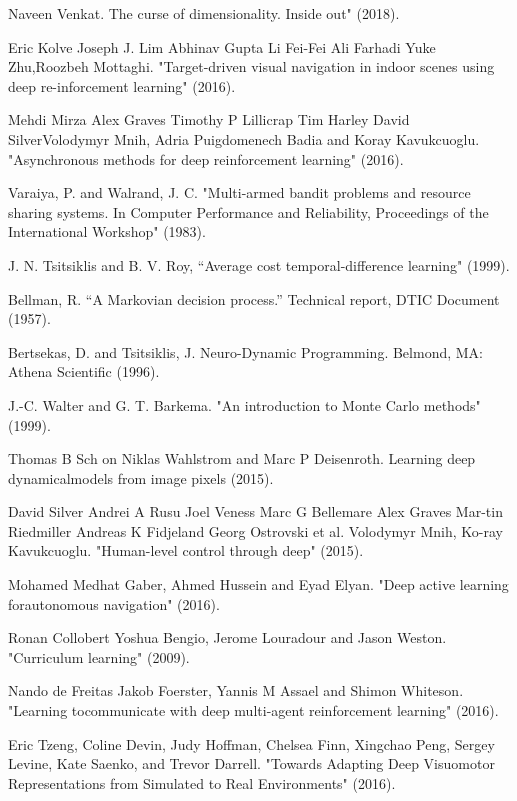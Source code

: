 \begin{thebibliography}{69}
 Naveen Venkat. The curse of dimensionality. Inside out" (2018).

 Eric Kolve Joseph J. Lim Abhinav Gupta Li Fei-Fei Ali Farhadi Yuke Zhu,Roozbeh Mottaghi. "Target-driven visual navigation in indoor scenes using deep re-inforcement learning" (2016).

 Mehdi Mirza Alex Graves Timothy P Lillicrap Tim Harley David SilverVolodymyr Mnih, Adria Puigdomenech Badia and Koray Kavukcuoglu. "Asynchronous methods for deep reinforcement learning" (2016).

 Varaiya, P. and Walrand, J. C. "Multi-armed bandit problems and resource sharing systems. In Computer Performance and Reliability, Proceedings of the International Workshop" (1983).

 J. N. Tsitsiklis and B. V. Roy, “Average cost temporal-difference learning" (1999).

 Bellman, R. “A Markovian decision process.” Technical report, DTIC Document (1957).

 Bertsekas, D. and Tsitsiklis, J. Neuro-Dynamic Programming. Belmond, MA: Athena Scientific (1996).

 J.-C. Walter and G. T. Barkema. "An introduction to Monte Carlo methods" (1999).

 Thomas B Sch on Niklas Wahlstrom and Marc P Deisenroth. Learning deep dynamicalmodels from image pixels (2015).

 David Silver Andrei A Rusu Joel Veness Marc G Bellemare Alex Graves Mar-tin Riedmiller Andreas K Fidjeland Georg Ostrovski et al. Volodymyr Mnih, Ko-ray Kavukcuoglu. "Human-level control through deep" (2015).

 Mohamed Medhat Gaber, Ahmed Hussein and Eyad Elyan. "Deep active learning forautonomous navigation" (2016).

 Ronan Collobert Yoshua Bengio, Jerome Louradour and Jason Weston. "Curriculum learning" (2009).

 Nando de Freitas Jakob Foerster, Yannis M Assael and Shimon Whiteson. "Learning tocommunicate with deep multi-agent reinforcement learning" (2016).

 Eric Tzeng, Coline Devin, Judy Hoffman, Chelsea Finn, Xingchao Peng, Sergey Levine, Kate Saenko, and Trevor Darrell. "Towards Adapting Deep Visuomotor Representations from Simulated to Real Environments" (2016).


\end{thebibliography}
